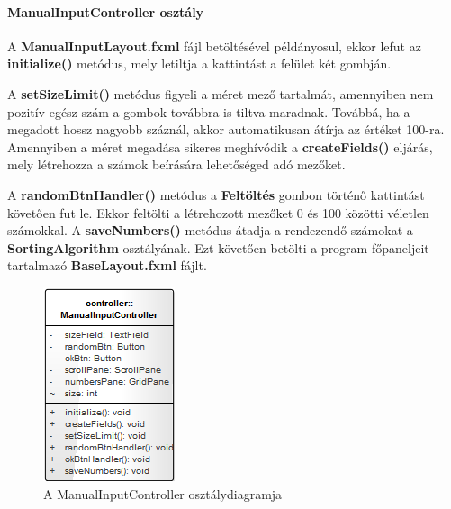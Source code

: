 \documentclass{elteikthesis}
\begin{document}
\paragraph{ManualInputController osztály}
A \textbf{ManualInputLayout.fxml} fájl betöltésével példányosul, ekkor lefut az \textbf{initialize()} metódus, mely letiltja a kattintást a felület két gombján.
\par A \textbf{setSizeLimit()} metódus figyeli a méret mező tartalmát, amennyiben nem pozitív egész szám a gombok továbbra is tiltva maradnak. Továbbá, ha a megadott hossz nagyobb száznál, akkor automatikusan átírja az értéket 100-ra. Amennyiben a méret megadása sikeres meghívódik a \textbf{createFields()} eljárás, mely létrehozza a számok beírására lehetőséged adó mezőket.\par
A \textbf{randomBtnHandler()} metódus a \textbf{Feltöltés} gombon történő kattintást követően fut le. Ekkor feltölti a létrehozott mezőket 0 és 100 közötti véletlen számokkal. A \textbf{saveNumbers()} metódus átadja a rendezendő számokat a \textbf{SortingAlgorithm} osztályának. Ezt követően betölti a program főpaneljeit tartalmazó \textbf{BaseLayout.fxml} fájlt.
\begin{figure}[H]
	\centering
	\includegraphics{pics/class/ManualInputController.png}
	\caption{A ManualInputController osztálydiagramja}
\end{figure}\par
\end{document}
